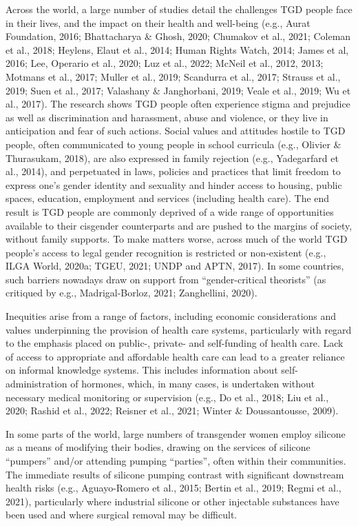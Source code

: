 \documentclass[
]{book}
\begin{document}
Across the world, a large number of studies
detail the challenges TGD people face in their
lives, and the impact on their health and
well-being (e.g., Aurat Foundation, 2016;
Bhattacharya \& Ghosh, 2020; Chumakov et al.,
2021; Coleman et al., 2018; Heylens, Elaut et al.,
2014; Human Rights Watch, 2014; James et al,
2016; Lee, Operario et al., 2020; Luz et al., 2022;
McNeil et al., 2012, 2013; Motmans et al., 2017;
Muller et al., 2019; Scandurra et al., 2017; Strauss
et al., 2019; Suen et al., 2017; Valashany \&
Janghorbani, 2019; Veale et al., 2019; Wu et al.,
2017). The research shows TGD people often
experience stigma and prejudice as well as discrimination and harassment, abuse and violence,
or they live in anticipation and fear of such
actions. Social values and attitudes hostile to
TGD people, often communicated to young people in school curricula (e.g., Olivier \&
Thurasukam, 2018), are also expressed in family
rejection (e.g., Yadegarfard et al., 2014), and perpetuated in laws, policies and practices that limit
freedom to express one's gender identity and sexuality and hinder access to housing, public spaces,
education, employment and services (including
health care). The end result is TGD people are
commonly deprived of a wide range of opportunities available to their cisgender counterparts
and are pushed to the margins of society, without
family supports. To make matters worse, across
much of the world TGD people's access to legal
gender recognition is restricted or non-existent
(e.g., ILGA World, 2020a; TGEU, 2021; UNDP
and APTN, 2017). In some countries, such barriers nowadays draw on support from
``gender-critical theorists'' (as critiqued by e.g.,
Madrigal-Borloz, 2021; Zanghellini, 2020).

Inequities arise from a range of factors, including economic considerations and values underpinning the provision of health care systems,
particularly with regard to the emphasis placed on
public-, private- and self-funding of health care.
Lack of access to appropriate and affordable health
care can lead to a greater reliance on informal
knowledge systems. This includes information
about self-administration of hormones, which, in
many cases, is undertaken without necessary medical monitoring or supervision (e.g., Do et al.,
2018; Liu et al., 2020; Rashid et al., 2022; Reisner
et al., 2021; Winter \& Doussantousse, 2009).

In some parts of the world, large numbers of
transgender women employ silicone as a means
of modifying their bodies, drawing on the services
of silicone ``pumpers'' and/or attending pumping
``parties'', often within their communities. The
immediate results of silicone pumping contrast
with significant downstream health risks (e.g.,
Aguayo-Romero et al., 2015; Bertin et al., 2019;
Regmi et al., 2021), particularly where industrial
silicone or other injectable substances have been
used and where surgical removal may be difficult.
\end{document}
